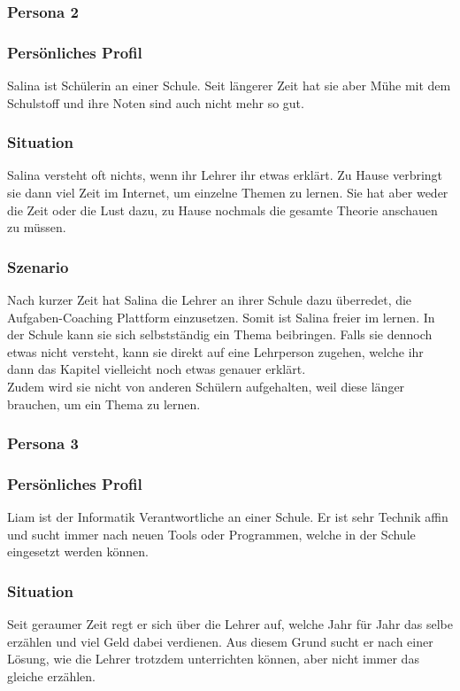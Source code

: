 \subsubsection{Persona 2}
\subsubsection*{Persönliches Profil}
Salina ist Schülerin an einer Schule. Seit längerer Zeit hat sie aber Mühe mit dem Schulstoff und ihre Noten sind auch nicht mehr so gut.

\subsubsection*{Situation}
Salina versteht oft nichts, wenn ihr Lehrer ihr etwas erklärt. Zu Hause verbringt sie dann viel Zeit im Internet, um einzelne Themen zu lernen. Sie hat aber weder die Zeit oder die Lust dazu, zu Hause nochmals die gesamte Theorie anschauen zu müssen.

\subsubsection*{Szenario}
Nach kurzer Zeit hat Salina die Lehrer an ihrer Schule dazu überredet, die Aufgaben-Coaching Plattform einzusetzen. Somit ist Salina freier im lernen. In der Schule kann sie sich selbstständig ein Thema beibringen. Falls sie dennoch etwas nicht versteht, kann sie direkt auf eine Lehrperson zugehen, welche ihr dann das Kapitel vielleicht noch etwas genauer erklärt. \\
Zudem wird sie nicht von anderen Schülern aufgehalten, weil diese länger brauchen, um ein Thema zu lernen.

\subsubsection{Persona 3}
\subsubsection*{Persönliches Profil}
Liam ist der Informatik Verantwortliche an einer Schule. Er ist sehr Technik affin und sucht immer nach neuen Tools oder Programmen, welche in der Schule eingesetzt werden können.

\subsubsection*{Situation}
Seit geraumer Zeit regt er sich über die Lehrer auf, welche Jahr für Jahr das selbe erzählen und viel Geld dabei verdienen. Aus diesem Grund sucht er nach einer Lösung, wie die Lehrer trotzdem unterrichten können, aber nicht immer das gleiche erzählen.

